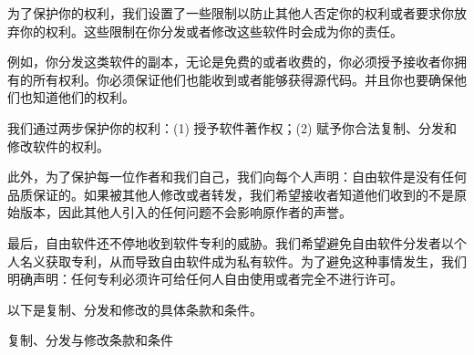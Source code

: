 \documentclass[11pt]{article}
\begin{document}
为了保护你的权利，我们设置了一些限制以防止其他人否定你的权利或者要求你放弃你的权利。这些限制在你分发或者修改这些软件时会成为你的责任。

例如，你分发这类软件的副本，无论是免费的或者收费的，你必须授予接收者你拥有的所有权利。你必须保证他们也能收到或者能够获得源代码。并且你也要确保他们也知道他们的权利。

我们通过两步保护你的权利：(1) 授予软件著作权；(2) 赋予你合法复制、分发和修改软件的权利。

此外，为了保护每一位作者和我们自己，我们向每个人声明：自由软件是没有任何品质保证的。如果被其他人修改或者转发，我们希望接收者知道他们收到的不是原始版本，因此其他人引入的任何问题不会影响原作者的声誉。

最后，自由软件还不停地收到软件专利的威胁。我们希望避免自由软件分发者以个人名义获取专利，从而导致自由软件成为私有软件。为了避免这种事情发生，我们明确声明：任何专利必须许可给任何人自由使用或者完全不进行许可。

以下是复制、分发和修改的具体条款和条件。

\begin{center}
{\Large \sc 复制、分发与修改条款和条件}
\end{center}
\end{document}
